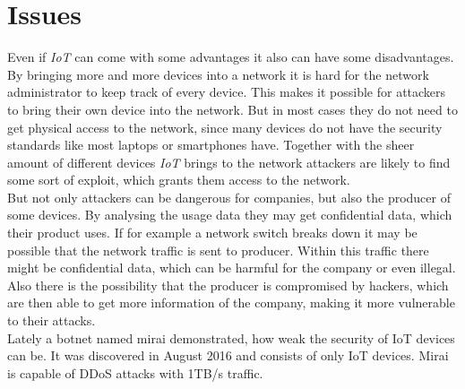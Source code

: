 \section{Issues}
Even if \textit{IoT} can come with some advantages it also can have some disadvantages. By bringing more and more devices into a network it is hard for the network administrator to keep track of every device. This makes it possible for attackers to bring their own device into the network. But in most cases they do not need to get physical access to the network, since many devices do not have the security standards like most laptops or smartphones have. Together with the sheer amount of different devices \textit{IoT} brings to the network attackers are likely to find some sort of exploit, which grants them access to the network. \\
But not only attackers can be dangerous for companies, but also the producer of some devices. By analysing the usage data they may get confidential data, which their product uses. If for example a network switch breaks down it may be possible that the network traffic is sent to producer. Within this traffic there might be confidential data, which can be harmful for the company or even illegal. Also there is the possibility that the producer is compromised by hackers, which are then able to get more information of the company, making it more vulnerable to their attacks. \\
Lately a botnet named mirai demonstrated, how weak the security of IoT devices can be. It was discovered in August 2016 and consists of only IoT devices. Mirai is capable of DDoS attacks with 1TB/s traffic.
